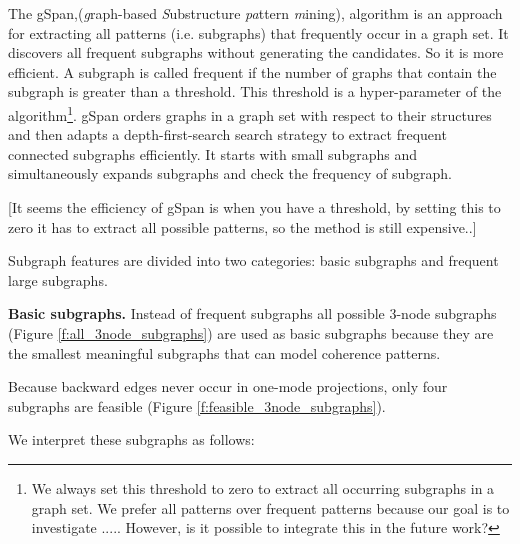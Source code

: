 The gSpan,(\textit{g}raph-based \textit{S}ubstructure \textit{pa}ttern \textit{m}ining), algorithm is an approach for extracting all patterns (i.e. subgraphs) that frequently occur in a graph set. 
It discovers all frequent subgraphs without generating the candidates. 
So it is more efficient. 
A subgraph is called frequent if the number of graphs that contain the subgraph is greater than a threshold. 
This threshold is a hyper-parameter of the algorithm\footnote{We always set this threshold to zero to extract all occurring subgraphs in a graph set. We prefer all patterns over frequent patterns because our goal is to investigate .....
 However, is it possible to integrate this in the future work?}.
 gSpan orders graphs in a graph set with respect to their structures and then adapts a depth-first-search search strategy to extract frequent connected subgraphs efficiently. 
 It starts with small subgraphs and simultaneously expands subgraphs and check the frequency of subgraph. 

 [It seems the efficiency of gSpan is when you have a threshold, by setting this to zero it has to extract all possible patterns, so the method is still expensive..]









Subgraph features are divided into two categories: basic subgraphs and frequent large subgraphs.

\textbf{Basic subgraphs.} Instead of frequent subgraphs all possible 3-node subgraphs (Figure \ref{f:all_3node_subgraphs}) are used as
basic subgraphs because they are the smallest meaningful subgraphs that can model coherence patterns. 

Because backward edges never occur in one-mode projections, only four subgraphs are feasible (Figure \ref{f:feasible_3node_subgraphs}).

%

We interpret these subgraphs as follows:

